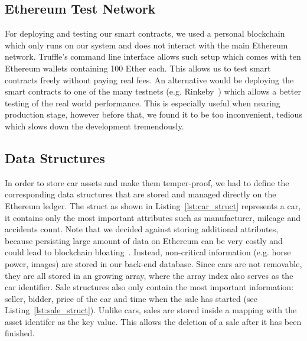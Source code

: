 \subsection{Ethereum Test Network}
For deploying and testing our smart contracts, we used a personal blockchain which only runs on our system and does not interact with the main Ethereum network. Truffle's command line interface allows such setup which comes with ten Ethereum wallets containing 100 Ether each. This allows us to test smart contracts freely without paying real fees. An alternative would be deploying the smart contracts to one of the many testnets (e.g. Rinkeby~\cite{Rinkeby}) which allows a better testing of the real world performance. This is especially useful when nearing production stage, however before that, we found it to be too inconvenient, tedious which slows down the development tremendously.

\subsection{Data Structures}
In order to store car assets and make them temper-proof, we had to define the corresponding data structures that are stored and managed directly on the Ethereum ledger. The struct as shown in Listing~\ref{lst:car_struct} represents a car, it contains only the most important attributes such as manufacturer, mileage and accidents count. Note that we decided against storing additional attributes, because persisting large amount of data on Ethereum can be very costly and could lead to blockchain bloating~\cite{BlockchainBloating}. Instead, non-critical information (e.g. horse power, images) are stored in our back-end database. Since cars are not removable, they are all stored in an growing array, where the array index also serves as the car identifier. Sale structures also only contain the most important information: seller, bidder, price of the car and time when the sale has started (see Listing~\ref{lst:sale_struct}). Unlike cars, sales are stored inside a mapping with the asset identifer as the key value. This allows the deletion of a sale after it has been finished.

